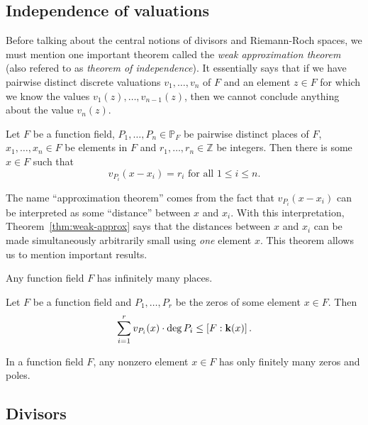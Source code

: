 \subsection{Independence of valuations}

Before talking about the central notions of divisors and Riemann-Roch spaces, we
must mention one important theorem called the \emph{weak approximation theorem}
(also refered to as \emph{theorem of independence}). It essentially says that
if we have pairwise distinct discrete valuations $v_1, \dots, v_n$ of $F$ and an
element $z\in F$ for which we know the values $v_1(z), \dots, v_{n-1}(z)$, then
we cannot conclude anything about the value $v_n(z)$.
\begin{thm}
  \label{thm:weak-approx}
  Let $F$ be a function field, $P_1, \dots, P_n\in\mathbb{P}_F$ be pairwise
  distinct places of $F$, $x_1, \dots, x_n\in F$ be elements in $F$ and $r_1,
  \dots, r_n\in\mathbb{Z}$ be integers. Then there is some $x\in F$ such that
  \[
    v_{P_i}(x-x_i) = r_i\text{ for all }1\leq i\leq n.
  \]
\end{thm}
The name ``approximation theorem'' comes from the fact that $v_{P_i}(x-x_i)$ can
be interpreted as some ``distance'' between $x$ and $x_i$. With this
interpretation, Theorem~\ref{thm:weak-approx} says that the distances between
$x$ and $x_i$ can be made simultaneously arbitrarily small using \emph{one}
element $x$. This theorem allows us to mention important results.
\begin{cor}
  Any function field $F$ has infinitely many places.
\end{cor}
\begin{prop}
  Let $F$ be a function field and $P_1, \dots, P_r$ be the zeros of some element
  $x\in F$. Then
  \[
    \sum_{i=1}^r{v_{P_i}(x)\cdot\deg P_i}\leq \left[ F:\mathbf{k}(x) \right].
  \]
\end{prop}
\begin{cor}
  In a function field $F$, any nonzero element $x\in F$ has only finitely many
  zeros and poles.
\end{cor}

\subsection{Divisors}

